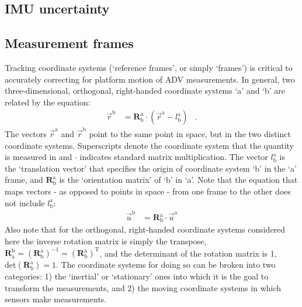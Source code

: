 

\def\Amat\ensuremath{}

\subsection{IMU uncertainty}\label{apdx:imu-uncertainty}

\subsection{Measurement frames}\label{apdx:coord-sys:meas}\label{apdx:coord-sys}

\def\a{\ensuremath{\mathrm{a}}}
\def\b{\ensuremath{\mathrm{b}}}
\def\lab{\ensuremath{l_\b^\a}}
\def\xa{\ensuremath{\vec{r}^\a}}
\def\xb{\ensuremath{\vec{r}^\b}}
\def\Rba{\ensuremath{\mathbf{R}^\a_\b}}

Tracking coordinate systems (`reference frames', or simply `frames') is critical to accurately correcting for platform motion of ADV measurements. In general, two three-dimensional, orthogonal, right-handed coordinate systems `a' and `b' are related by the equation:
\begin{align*}
  \xb &= \Rba \cdot (\xa - \lab) & .
\end{align*}
The vectors $\xa$ and $\xb$ point to the same point in space, but in the two distinct coordinate systems.  Superscripts denote the coordinate system that the quantity is measured in and $\cdot$ indicates standard matrix multiplication.  The vector $\lab$ is the `translation vector' that specifies the origin of coordinate system `b' in the `a' frame, and $\mathbf{R}^\mathrm{a}_\mathrm{b}$ is the `orientation matrix' of `b' in `a'. Note that the equation that maps vectors - as opposed to points in space - from one frame to the other does not include $\lab$:
\begin{align}
  \vec{u}^\mathrm{b} & = \Rba \cdot \vec{u}^\mathrm{a}
\end{align}
Also note that for the orthogonal, right-handed coordinate systems considered here the inverse rotation matrix is simply the transpose, $\mathbf{R}^{\mathrm{b}}_{\mathrm{a}}  = (\Rba)^{-1} = (\Rba)^\mathrm{T} $, and the determinant of the rotation matrix is 1, $\mathrm{det}(\Rba ) = 1$.
The coordinate systems for doing so can be broken into two categories: 1) the `inertial' or `stationary' ones into which it is the goal to transform the measurements, and 2) the moving coordinate systems in which sensors make measurements. 

